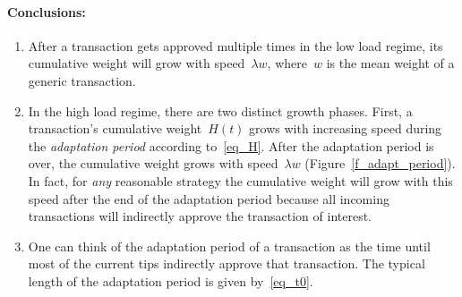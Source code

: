 \documentclass[12pt]{article}
\begin{document}
\paragraph{Conclusions:}
\begin{enumerate}
 \item After a transaction gets approved multiple times 
 in the low load regime, 
its cumulative weight will grow 
with speed~$\lambda w$, where~$w$ is the mean weight
of a generic transaction.
 \item In the high load regime, there are two distinct growth 
 phases. First, a transaction's 
cumulative weight~$H(t)$ grows with increasing
speed during the \emph{adaptation period}
according to~\eqref{eq_H}. After
the adaptation period is over, the cumulative weight grows 
with speed~$\lambda w$ (Figure~\ref{f_adapt_period}).
In fact, for \emph{any} reasonable strategy the cumulative
weight will grow with this speed after the end
of the adaptation period because 
all incoming transactions will indirectly approve  
the transaction of interest.
 \item One can think of the adaptation period of a 
 transaction as the time until most of the current tips indirectly
approve that transaction. The typical length of the 
adaptation period is given by~\eqref{eq_t0}.
\end{enumerate}
\end{document}
